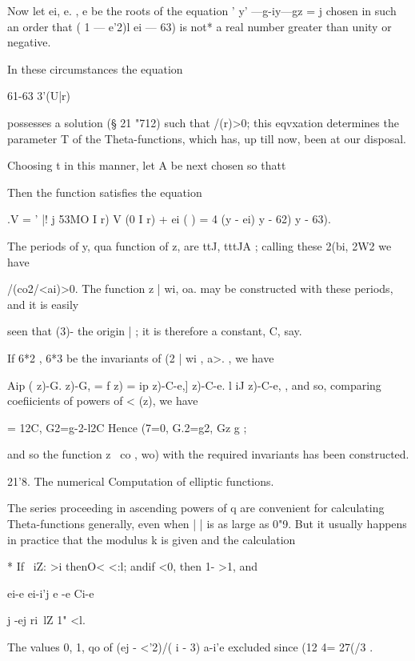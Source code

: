 Now let ei, e. , e  be the roots of the equation ' y' —g-iy—gz =  j chosen in such an order 
that ( 1 — e'2)l ei — 63) is not* a real number greater than unity or negative. 

In these circumstances the equation 

61-63  3'(U|r) 

possesses a solution (§ 21 "712) such that /(r)>0; this eqvxation determines the parameter 
T of the Theta-functions, which has, up till now, been at our disposal. 

Choosing t in this manner, let A be next chosen so thatt 



Then the function 
satisfies the equation 



.V =  ' |! j 53MO I r) V (0 I r) + ei 
(   ) = 4 (y - ei)  y - 62)  y - 63). 



The periods of y, qua function of z, are ttJ, tttJA ; calling these 2(bi, 2W2 we have 

/(co2/<ai)>0. 
The function   z | wi, oa.  may be constructed with these periods, and it is easily 

seen that  (3)- %
the origin | ; it is therefore a constant, C, say. 

If 6*2 , 6*3 be the invariants of   (2 | wi , a>. , we have 

Aip ( z)-G.  z)-G, = f  z) =   ip z)-C-e,]   z)-C-e. l iJ z)-C-e, , 
and so, comparing coefiicients of powers of <  (z), we have 

= 12C, G2=g-2-l2C%
Hence (7=0, G.2=g2, Gz g ; 

and so the function   z \ co , wo) with the required invariants has been constructed. 

21'8. The numerical Computation of elliptic functions. 

The series proceeding in ascending powers of q are convenient for 
calculating Theta-functions generally, even when |   | is as large as 0"9. But 
it usually happens in practice that the modulus k is given and the calculation 

* If  \ iZ: >i thenO<   <:l; andif   <0, then 1-  >1, and 

ei-e  ei-i'j e -e  Ci-e  

 j -ej   ri\  lZ 1" <l. 

The values 0, 1, qo of (ej - <'2)/( i -  3) a-i'e excluded since (12  4= 27(/3 . 


